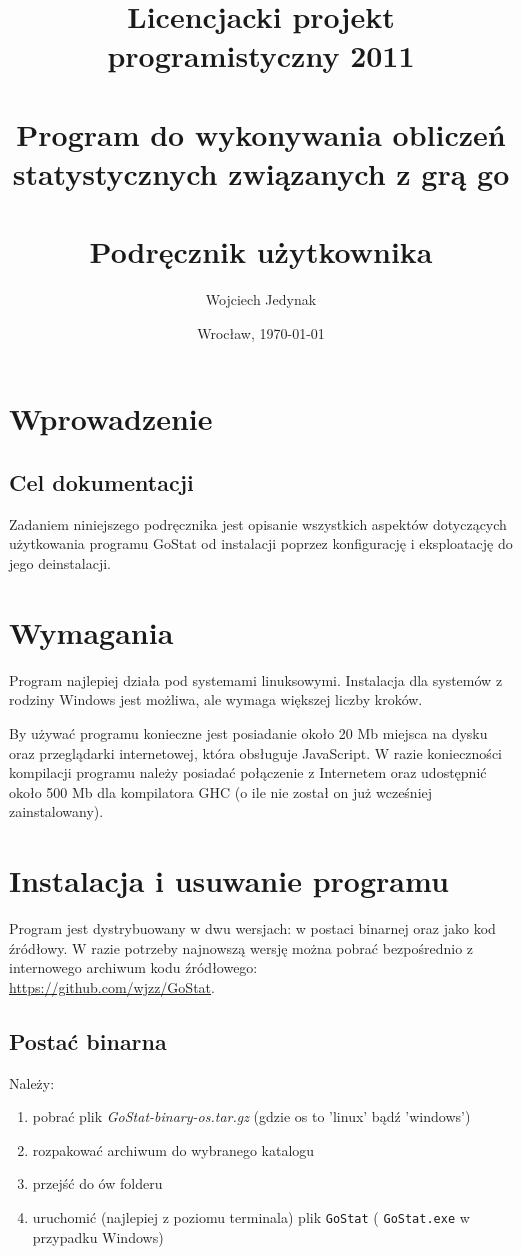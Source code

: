 \documentclass[10pt,leqno]{article}
\title{\LARGE Licencjacki projekt programistyczny 2011 \\ 
       \ \\
       Program do wykonywania obliczeń statystycznych związanych z grą go \\ 
       \ \\
       Podręcznik użytkownika }
\author{Wojciech Jedynak}
\date{Wrocław, \today}
\newcommand{\cmd}[1]{
  \texttt{#1}
}
\begin{document}
\maketitle 

\thispagestyle{empty}
\tableofcontents

\newpage

\section{Wprowadzenie}

\subsection{Cel dokumentacji}
Zadaniem niniejszego podręcznika jest opisanie wszystkich aspektów dotyczących użytkowania programu GoStat od instalacji poprzez konfigurację
i eksploatację do jego deinstalacji.

\section{Wymagania}
Program najlepiej działa pod systemami linuksowymi. Instalacja dla systemów z rodziny Windows jest możliwa, ale wymaga większej liczby kroków. 

By używać programu konieczne jest posiadanie około 20 Mb miejsca na dysku oraz przeglądarki internetowej, która obsługuje JavaScript. 
W razie konieczności kompilacji programu należy posiadać połączenie z Internetem oraz udostępnić około 500 Mb dla kompilatora GHC (o ile nie 
został on już wcześniej zainstalowany).

\newpage

\section{Instalacja i usuwanie programu}
Program jest dystrybuowany w dwu wersjach: w postaci binarnej oraz jako kod źródłowy. W razie potrzeby najnowszą wersję można 
pobrać bezpośrednio z internowego archiwum kodu źródłowego: \\ 
\url{https://github.com/wjzz/GoStat}.

\subsection{Postać binarna}
Należy: 
\begin{enumerate}
\item pobrać plik \emph{GoStat-binary-os.tar.gz} (gdzie os to 'linux' bądź 'windows')
\item rozpakować archiwum do wybranego katalogu
\item przejść do ów folderu
\item uruchomić (najlepiej z poziomu terminala) plik \cmd{GoStat} (\cmd{GoStat.exe} w przypadku Windows)
\end{enumerate}
\end{document}

